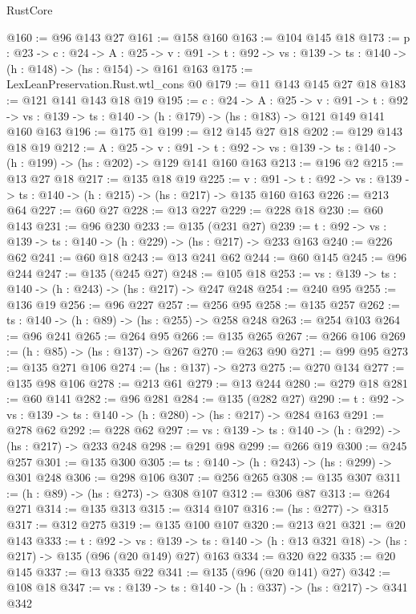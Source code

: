 \begin{lexlean}{RustCore}
\begin{coremodule}
@160 := @96 @143 @27
@161 := @158 @160
@163 := @104 @145 @18
@173 := {p : @23} ->
  {c : @24} ->
  {A : @25} ->
  {v : @91} -> {t : @92} -> {vs : @139} -> {ts : @140} -> (h : @148) -> (hs : @154) -> @161 @163
@175 := LexLeanPreservation.Rust.wtl_cons @0
@179 := @11 @143 @145 @27 @18
@183 := @121 @141 @143 @18 @19
@195 := {c : @24} ->
  {A : @25} ->
  {v : @91} ->
  {t : @92} -> {vs : @139} -> {ts : @140} -> (h : @179) -> (hs : @183) -> @121 @149 @141 @160 @163
@196 := @175 @1
@199 := @12 @145 @27 @18
@202 := @129 @143 @18 @19
@212 := {A : @25} ->
  {v : @91} ->
  {t : @92} -> {vs : @139} -> {ts : @140} -> (h : @199) -> (hs : @202) -> @129 @141 @160 @163
@213 := @196 @2
@215 := @13 @27 @18
@217 := @135 @18 @19
@225 := {v : @91} ->
  {t : @92} -> {vs : @139} -> {ts : @140} -> (h : @215) -> (hs : @217) -> @135 @160 @163
@226 := @213 @64
@227 := @60 @27
@228 := @13 @227
@229 := @228 @18
@230 := @60 @143
@231 := @96 @230
@233 := @135 (@231 @27)
@239 := {t : @92} -> {vs : @139} -> {ts : @140} -> (h : @229) -> (hs : @217) -> @233 @163
@240 := @226 @62
@241 := @60 @18
@243 := @13 @241 @62
@244 := @60 @145
@245 := @96 @244
@247 := @135 (@245 @27)
@248 := @105 @18
@253 := {vs : @139} -> {ts : @140} -> (h : @243) -> (hs : @217) -> @247 @248
@254 := @240 @95
@255 := @136 @19
@256 := @96 @227
@257 := @256 @95
@258 := @135 @257
@262 := {ts : @140} -> (h : @89) -> (hs : @255) -> @258 @248
@263 := @254 @103
@264 := @96 @241
@265 := @264 @95
@266 := @135 @265
@267 := @266 @106
@269 := (h : @85) -> (hs : @137) -> @267
@270 := @263 @90
@271 := @99 @95
@273 := @135 @271 @106
@274 := (hs : @137) -> @273
@275 := @270 @134
@277 := @135 @98 @106
@278 := @213 @61
@279 := @13 @244
@280 := @279 @18
@281 := @60 @141
@282 := @96 @281
@284 := @135 (@282 @27)
@290 := {t : @92} -> {vs : @139} -> {ts : @140} -> (h : @280) -> (hs : @217) -> @284 @163
@291 := @278 @62
@292 := @228 @62
@297 := {vs : @139} -> {ts : @140} -> (h : @292) -> (hs : @217) -> @233 @248
@298 := @291 @98
@299 := @266 @19
@300 := @245 @257
@301 := @135 @300
@305 := {ts : @140} -> (h : @243) -> (hs : @299) -> @301 @248
@306 := @298 @106
@307 := @256 @265
@308 := @135 @307
@311 := (h : @89) -> (hs : @273) -> @308 @107
@312 := @306 @87
@313 := @264 @271
@314 := @135 @313
@315 := @314 @107
@316 := (hs : @277) -> @315
@317 := @312 @275
@319 := @135 @100 @107
@320 := @213 @21
@321 := @20 @143
@333 := {t : @92} ->
  {vs : @139} -> {ts : @140} -> (h : @13 @321 @18) -> (hs : @217) -> @135 (@96 (@20 @149) @27) @163
@334 := @320 @22
@335 := @20 @145
@337 := @13 @335 @22
@341 := @135 (@96 (@20 @141) @27)
@342 := @108 @18
@347 := {vs : @139} -> {ts : @140} -> (h : @337) -> (hs : @217) -> @341 @342

\end{coremodule}
\end{lexlean}
